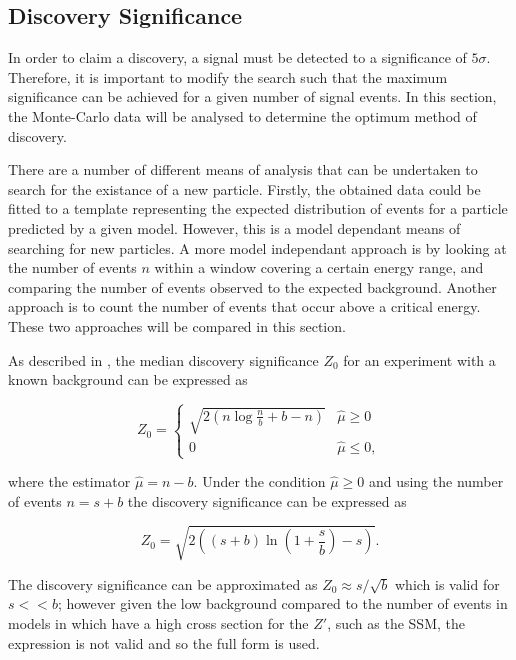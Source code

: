 \documentclass{article}
\begin{document}
\subsection{Discovery Significance}

In order to claim a discovery, a signal must be detected to a significance of $5\sigma$. Therefore, it is important to modify the search such that the maximum significance can be achieved for a given number of signal events. In this section, the Monte-Carlo data will be analysed to determine the optimum method of discovery.

There are a number of different means of analysis that can be undertaken to search for the existance of a new particle. Firstly, the obtained data could be fitted to a template representing the expected distribution of events for a particle predicted by a given model. However, this is a model dependant means of searching for new particles. A more model independant approach is by looking at the number of events $n$ within a window covering a certain energy range, and comparing the number of events observed to the expected background. Another approach is to count the number of events that occur above a critical energy. These two approaches will be compared in this section.

As described in \cite{Cowan:2010js}, the median discovery significance $Z_0$ for an experiment with a known background can be expressed as

\begin{equation}
Z_0 = \begin{cases}
    \sqrt{2\left(n\log\frac{n}{b}+b-n \right)} & \widehat{\mu}\geq0\\        0         & \widehat{\mu}\leq0,
\end{cases}
\end{equation}

where the estimator $\widehat{\mu}=n-b$. Under the condition $\widehat{\mu}\geq0$ and using the number of events $n=s+b$ the discovery significance can be expressed as 

\begin{equation}
Z_0 = \sqrt{2\left(  (s+b)\ln\left(1+\frac{s}{b}\right)  - s \right)}.
\label{eqn:asimov}
\end{equation}

The discovery significance can be approximated as $Z_0\approx s/\sqrt{b}$ which is valid for $s<<b$; however given the low background compared to the number of events in models in which have a high cross section for the $Z'$, such as the SSM, the expression is not valid and so the full form is used.
\end{document}

